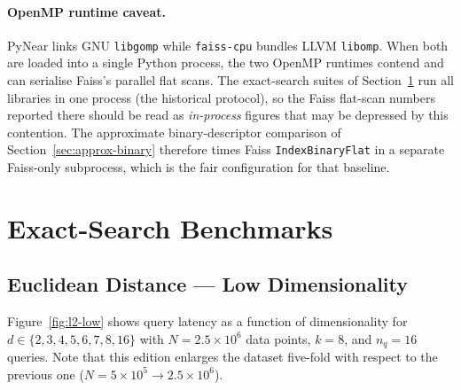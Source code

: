 \documentclass[11pt,a4paper]{article}
\begin{document}
\paragraph{OpenMP runtime caveat.}
PyNear links GNU \texttt{libgomp} while \texttt{faiss-cpu} bundles LLVM
\texttt{libomp}.  When both are loaded into a single Python process, the two
OpenMP runtimes contend and can serialise Faiss's parallel flat scans.  The
exact-search suites of Section~\ref{sec:exact} run all libraries in one
process (the historical protocol), so the Faiss flat-scan numbers reported
there should be read as \emph{in-process} figures that may be depressed by
this contention.  The approximate binary-descriptor comparison of
Section~\ref{sec:approx-binary} therefore times Faiss
\texttt{IndexBinaryFlat} in a separate Faiss-only subprocess, which is the
fair configuration for that baseline.

\section{Exact-Search Benchmarks}
\label{sec:exact}

\subsection{Euclidean Distance — Low Dimensionality}
\label{sec:l2-low}

Figure~\ref{fig:l2-low} shows query latency as a function of dimensionality
for $d \in \{2, 3, 4, 5, 6, 7, 8, 16\}$ with $N = 2.5 \times 10^6$ data
points, $k = 8$, and $n_q = 16$ queries.  Note that this edition enlarges
the dataset five-fold with respect to the previous one
($N = 5\times10^5 \to 2.5\times10^6$).
\end{document}
